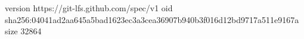 version https://git-lfs.github.com/spec/v1
oid sha256:04041ad2aa645a5bad1623ec3a3cea36907b940b3f016d12bd9717a511e9167a
size 32864
